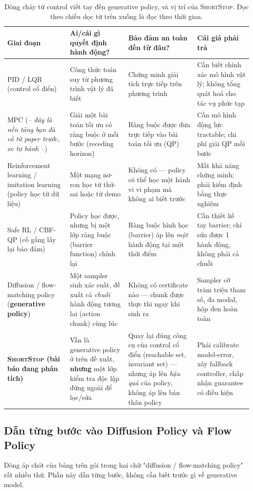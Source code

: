\documentclass[a4paper,12pt]{article}
\newcommand{\st}{\textsc{ShortStop}}
\begin{document}
\begin{table}[H]
\centering\small
\begin{tabularx}{\textwidth}{@{}l X X X@{}}
\toprule
Giai đoạn & Ai/cái gì quyết định hành động? & Bảo đảm an toàn đến từ đâu? & Cái giá phải trả \\
\midrule
PID / LQR (control cổ điển) & Công thức toán suy từ phương trình vật lý đã biết & Chứng minh giải tích trực tiếp trên phương trình & Cần biết chính xác mô hình vật lý; không tổng quát hoá cho tác vụ phức tạp \\
MPC (\emph{-- đây là nền tảng bạn đã có từ paper trước, xe tự hành --}) & Giải một bài toán tối ưu có ràng buộc ở mỗi bước (receding horizon) & Ràng buộc được đưa trực tiếp vào bài toán tối ưu (QP) & Cần mô hình động lực tractable; chi phí giải QP mỗi bước \\
Reinforcement learning / imitation learning (policy học từ dữ liệu) & Một mạng nơ-ron học từ thử-sai hoặc từ demo & Không có --- policy có thể học một hành vi vi phạm mà không ai biết trước & Mất khả năng chứng minh; phải kiểm định bằng thực nghiệm \\
Safe RL / CBF-QP (cố gắng lấy lại bảo đảm) & Policy học được, nhưng bị một lớp ràng buộc (barrier function) chỉnh lại & Ràng buộc hình học (barrier) áp lên \emph{một} hành động tại một thời điểm & Cần thiết kế tay barrier; chỉ sửa được 1 hành động, không phải cả chuỗi \\
Diffusion / flow-matching policy (\textbf{generative policy}) & Một sampler sinh xác suất, đề xuất cả \emph{chuỗi} hành động tương lai (action chunk) cùng lúc & Không có certificate nào --- chunk được thực thi ngay khi sinh ra & Sampler cỡ trăm triệu tham số, đa modal, hộp đen hoàn toàn \\
\textbf{\st{} (bài báo đang phân tích)} & Vẫn là generative policy ở trên đề xuất, \textbf{nhưng} một lớp kiểm tra độc lập đứng ngoài để lọc/sửa & Quay lại đúng công cụ của control cổ điển (reachable set, invariant set) --- nhưng áp lên \emph{hậu quả} của policy, không áp lên bản thân policy & Phải calibrate model-error, xây fallback controller, chấp nhận guarantee có điều kiện \\
\bottomrule
\end{tabularx}
\caption{Dòng chảy từ control viết tay đến generative policy, và vị trí của \st{}. Đọc theo chiều dọc từ trên xuống là đọc theo thời gian.}
\end{table}

\subsection{Dẫn từng bước vào Diffusion Policy và Flow Policy}\label{sec:diffusion-intro}
Dòng áp chót của bảng trên gói trong hai chữ "diffusion / flow-matching policy" rất nhiều thứ. Phần này dẫn từng bước, không cần biết trước gì về generative model.
\end{document}
